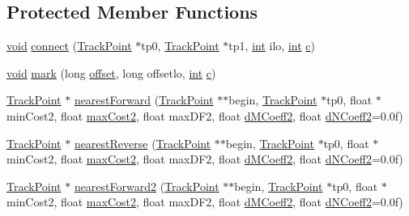\subsection*{Protected Member Functions}
\begin{DoxyCompactItemize}
\item 
\hyperlink{sound_8c_ae35f5844602719cf66324f4de2a658b3}{void} \hyperlink{class__sbsms___1_1_s_m_s_a3ae4728e81c8d38cc55f8bd06e309e41}{connect} (\hyperlink{class__sbsms___1_1_track_point}{Track\+Point} $\ast$tp0, \hyperlink{class__sbsms___1_1_track_point}{Track\+Point} $\ast$tp1, \hyperlink{xmltok_8h_a5a0d4a5641ce434f1d23533f2b2e6653}{int} ilo, \hyperlink{xmltok_8h_a5a0d4a5641ce434f1d23533f2b2e6653}{int} \hyperlink{rfft2d_test_m_l_8m_ae0323a9039add2978bf5b49550572c7c}{c})
\item 
\hyperlink{sound_8c_ae35f5844602719cf66324f4de2a658b3}{void} \hyperlink{class__sbsms___1_1_s_m_s_a1e4e4528208c0dbba0d0234d76cdc9e2}{mark} (long \hyperlink{layer12_8c_a33d71f23ba2052d17f0b754dc35265b0}{offset}, long offsetlo, \hyperlink{xmltok_8h_a5a0d4a5641ce434f1d23533f2b2e6653}{int} \hyperlink{rfft2d_test_m_l_8m_ae0323a9039add2978bf5b49550572c7c}{c})
\item 
\hyperlink{class__sbsms___1_1_track_point}{Track\+Point} $\ast$ \hyperlink{class__sbsms___1_1_s_m_s_a0fb8a238e19ae72c412c2d958dd19c43}{nearest\+Forward} (\hyperlink{class__sbsms___1_1_track_point}{Track\+Point} $\ast$$\ast$begin, \hyperlink{class__sbsms___1_1_track_point}{Track\+Point} $\ast$tp0, float $\ast$min\+Cost2, float \hyperlink{class__sbsms___1_1_s_m_s_ad1797e7e94e753371a63c4f18aa1c70d}{max\+Cost2}, float max\+D\+F2, float \hyperlink{class__sbsms___1_1_s_m_s_a352aeafbe990c087aca31c96ca9ce6f4}{d\+M\+Coeff2}, float \hyperlink{class__sbsms___1_1_s_m_s_a4689a6dba721b47b94e74bb01b54a737}{d\+N\+Coeff2}=0.\+0f)
\item 
\hyperlink{class__sbsms___1_1_track_point}{Track\+Point} $\ast$ \hyperlink{class__sbsms___1_1_s_m_s_a4fbab6547efea452877435e197f19e86}{nearest\+Reverse} (\hyperlink{class__sbsms___1_1_track_point}{Track\+Point} $\ast$$\ast$begin, \hyperlink{class__sbsms___1_1_track_point}{Track\+Point} $\ast$tp0, float $\ast$min\+Cost2, float \hyperlink{class__sbsms___1_1_s_m_s_ad1797e7e94e753371a63c4f18aa1c70d}{max\+Cost2}, float max\+D\+F2, float \hyperlink{class__sbsms___1_1_s_m_s_a352aeafbe990c087aca31c96ca9ce6f4}{d\+M\+Coeff2}, float \hyperlink{class__sbsms___1_1_s_m_s_a4689a6dba721b47b94e74bb01b54a737}{d\+N\+Coeff2}=0.\+0f)
\item 
\hyperlink{class__sbsms___1_1_track_point}{Track\+Point} $\ast$ \hyperlink{class__sbsms___1_1_s_m_s_a22664a6ce7cdbd9028a18e38c89eaeb8}{nearest\+Forward2} (\hyperlink{class__sbsms___1_1_track_point}{Track\+Point} $\ast$$\ast$begin, \hyperlink{class__sbsms___1_1_track_point}{Track\+Point} $\ast$tp0, float $\ast$min\+Cost2, float \hyperlink{class__sbsms___1_1_s_m_s_ad1797e7e94e753371a63c4f18aa1c70d}{max\+Cost2}, float max\+D\+F2, float \hyperlink{class__sbsms___1_1_s_m_s_a352aeafbe990c087aca31c96ca9ce6f4}{d\+M\+Coeff2}, float \hyperlink{class__sbsms___1_1_s_m_s_a4689a6dba721b47b94e74bb01b54a737}{d\+N\+Coeff2}=0.\+0f)
$$
\end{DoxyCompactItemize}
